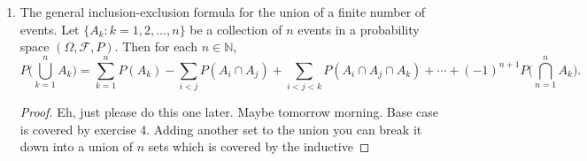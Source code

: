 \documentclass[12pt]{article}
\begin{document}
\begin{enumerate}
\begin{proof}
            did in exercise 4, we want to re-express $A\cup B\cup C$ as a union
            of disjoint events. We have \begin{align*} A\cup B\cup C &= A\cup
                (B\cup C) \\ &=A\cup(B\cup(C\backslash B)) \\
            &=A\cup(B\cup(C\backslash B))\backslash A.  \end{align*} By
            exercise 4, it follows that \begin{align*} P(A\cup B\cup C) &=
                P(A\cup(B\cup(C\backslash B))\backslash A) \\
                &=P(A)+P((B\cup(C\backslash B))\backslash
                A)-P(A\cap(B\cup(C\backslash B))\backslash A) \\
                &=P(A)+P((B\cup(C\backslash B))\backslash A) \\ &=P(A)+P(B\cup
                (C\backslash B))-P(A\cap(B\cup (C\backslash B)) \\
                    &=P(A)+P(B)+P(C\backslash B)-P((A\cap B)\cup(A\cap
                    (C\backslash B))) \\ &=P(A)+P(B)+P(C)-P(B\cap C)-P(A\cap
                    B)-P(A\cap (C\backslash B)) \\ &=P(A)+P(B)+P(C)-P(A\cap
                    B)-P(B\cap C)-P((A\cap C)\backslash B) \\
                    &=P(A)+P(B)+P(C)-P(A\cap B)-P(B\cap C)-P((A\cap
            C)\backslash(A\cap B\cap C)) \\ &=P(A)+P(B)+P(C)-P(A\cap B)-P(A\cap
    C)-P(B\cap C)+P(A\cap B\cap C).  \end{align*} \end{proof} \item The general
    inclusion-exclusion formula for the union of a finite number of events. Let
    $\{A_k:k=1, 2, \dots, n\}$ be a collection of $n$ events in a probability
    space $(\Omega, \mathcal{F}, P)$. Then for each $n\in\mathbb{N}$,
    \begin{equation*} P\big(\bigcup_{k=1}^n
    A_k\big)=\sum_{k=1}^nP(A_k)-\sum_{i<j}P(A_i\cap A_j)+\sum_{i<j<k}P(A_i\cap
A_j\cap A_k)+\cdots+(-1)^{n+1}P\big(\bigcap_{n=1}^n A_k\big).  \end{equation*}
\begin{proof} Eh, just please do this one later. Maybe tomorrow morning. Base
    case is covered by exercise 4. Adding another set to the union you can
    break it down into a union of $n$ sets which is covered by the inductive

\end{proof}
\end{enumerate}
\end{document}
